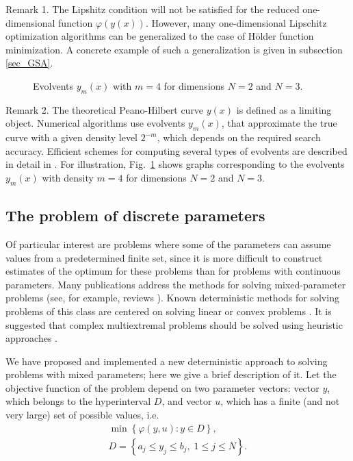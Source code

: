 \documentclass[preprint,12pt]{elsarticle}
\begin{document}
Remark 1.  The Lipshitz condition will not be satisfied for the reduced one-dimensional function $\varphi(y(x))$. However, many one-dimensional Lipschitz optimization algorithms can be generalized to the case of H{\"o}lder function minimization. A concrete example of such a generalization is given in subsection \ref{sec_GSA}.

\begin{figure}
\center
\begin{minipage}{0.45\linewidth}
\end{minipage}
\begin{minipage}{0.45\linewidth}
\end{minipage}
\caption{Evolvents $y_m(x)$ with $m=4$ for dimensions $N=2$ and $N=3$.}\label{fig:Peano}
\end{figure}   

Remark 2. The theoretical Peano-Hilbert curve $y(x)$ is defined as a limiting object. Numerical algorithms use evolvents $y_m(x)$, that approximate the true curve with a given density level $2^{-m}$, which depends on the required search accuracy. Efficient schemes for computing several types of evolvents are described in detail in \cite{Sergeyev2013}. For illustration, Fig.~\ref{fig:Peano} shows graphs corresponding to the evolvents $y_m(x)$ with density $m=4$ for dimensions $N=2$ and $N=3$.

\subsection{The problem of discrete parameters}
\label{sec_discr} 

Of particular interest are problems where some of the parameters can assume values from a predetermined finite set, since it is more difficult to construct estimates of the optimum for these problems than for problems with continuous parameters. Many publications address the methods for solving mixed-parameter problems (see, for example, reviews \cite{Burer2012,Boukouvala2016}). Known deterministic methods for solving problems of this class are centered on solving linear or convex problems \cite{Lee2012}. It is suggested that complex multiextremal problems should be solved using heuristic approaches \cite{Belotti2013}. 

We have proposed and implemented a new deterministic approach to solving problems with mixed parameters; here we give a brief description of it. 
Let the objective function of the problem depend on two parameter vectors: vector $y$, which belongs to the hyperinterval $D$, and vector $u$, which has a finite (and not very large) set of possible values, i.e.
\begin{gather}\label{problem_i}
\min{\left\{ \varphi(y,u) : y\in D \right\}},\\
D=\left\{a_j \leq y_j \leq b_j, \; 1\leq j \leq N \right\}.\nonumber
\end{gather}
\end{document}
